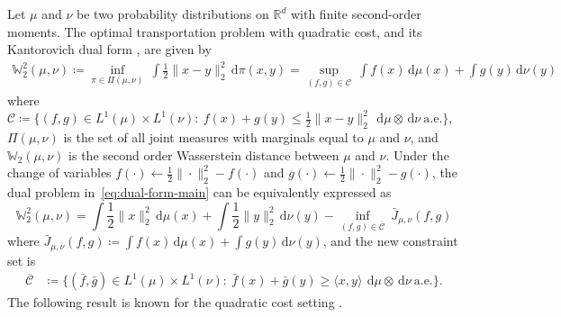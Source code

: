 \documentclass[10pt]{article}
\newcommand{\ud}{\,\mathrm{d}}
\newcommand{\norm}[1]{\|#1\|}
\newcommand{\real}{\mathbb{R}}
\newcommand{\W}{\mathds{W}}
\newcommand{\calC}{\mathcal{C}}
\numberwithin{equation}{section}
\begin{document}
Let $\mu$ and $\nu$ be two probability distributions on $\real^d$ with finite second-order moments. 
The optimal transportation problem with quadratic cost, and its Kantorovich dual form \citep[Theorem 1.3]{villani2003topics}, are given by 
\begin{align}%
\W_2^2(\mu,\nu)
\coloneqq\inf_{\pi \in \Pi(\mu,\nu)}~\int \frac{1}{2}\norm{x-y}^2_2\ud \pi(x,y)
= \sup_{(f,g)\in\calC}~\int f(x)\ud \mu(x) + \int g(y)\ud \nu(y) \label{eq:dual-form-main}
\end{align}
where $\calC \coloneqq \bigl\{(f,g)\in L^1(\mu)\times L^1(\nu):~f(x)+g(y)\leq \frac{1}{2}\norm{x-y}^2_2~\ud \mu \otimes \ud \nu~\text{a.e.}\bigr\}$, $\Pi(\mu,\nu)$ is the set of all joint measures with marginals equal to $\mu$ and $\nu$, and $\W_2(\mu,\nu)$ is the second order Wasserstein distance between $\mu$ and $\nu$. Under the change of variables $f(\cdot) \leftarrow \frac{1}{2}\norm{\cdot}_2^2-f(\cdot)$ and $g(\cdot) \leftarrow \frac{1}{2}\norm{\cdot}_2^2-g(\cdot)$, the dual problem in~\eqref{eq:dual-form-main} can be equivalently expressed as
\begin{equation}
\W_2^2(\mu,\nu)
= \int\frac{1}{2}\norm{x}_2^2 \ud \mu(x) + \int\frac{1}{2}\norm{y}_2^2 \ud \nu(y) - 
\inf_{(f,g) \in \overline{\calC} } ~\bar{J}_{\mu,\nu}(f,g) 
\label{eq:kantorovich-quad}
\end{equation}
where $\bar{J}_{\mu,\nu}(f,g) \coloneqq \int f(x)\ud \mu(x) + \int g(y)\ud \nu(y)$, and the new constraint set is
\begin{align*}%
\overline{\calC} &\coloneqq \bigl\{(\bar{f},\bar{g})\in L^1(\mu)\times L^1(\nu):~\bar{f}(x)+\bar{g}(y)\geq \langle x, y\rangle~\ud \mu \otimes \ud \nu~\text{a.e.}\bigr\}.
\end{align*} 
The following result is known for the quadratic cost setting \cite[Theorems 2.9~and 2.12]{villani2003topics}.
\end{document}
